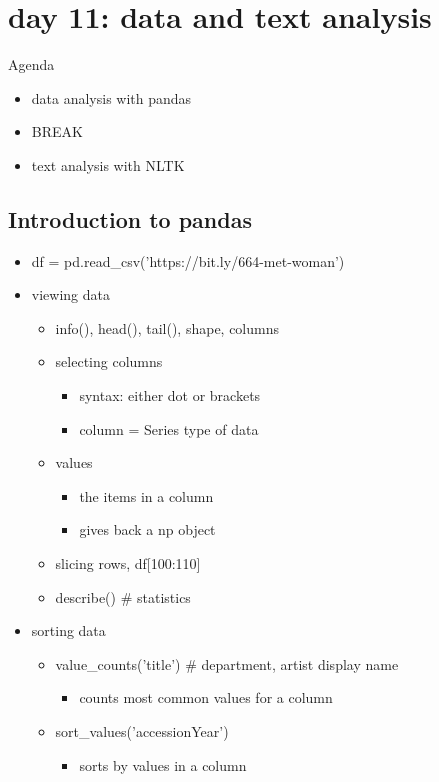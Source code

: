 \documentclass[11pt]{article}
\author{fcalado}
\date{\today}
\title{}
\begin{document}
\tableofcontents

\section{day 11: data and text analysis}
\label{sec:orge4bcb2c}
Agenda
\begin{itemize}
\item data analysis with pandas
\item BREAK
\item text analysis with NLTK
\end{itemize}

\subsection{Introduction to pandas}
\label{sec:orgc60713e}
\begin{itemize}
\item df = pd.read\_csv('https://bit.ly/664-met-woman')
\item viewing data
\begin{itemize}
\item info(), head(), tail(), shape, columns
\item selecting columns
\begin{itemize}
\item syntax: either dot or brackets
\item column = Series type of data
\end{itemize}
\item values
\begin{itemize}
\item the items in a column
\item gives back a np object
\end{itemize}
\item slicing rows, df[100:110]
\item describe() \# statistics
\end{itemize}
\item sorting data
\begin{itemize}
\item value\_counts('title') \# department, artist display name
\begin{itemize}
\item counts most common values for a column
\end{itemize}
\item sort\_values('accessionYear')
\begin{itemize}
\item sorts by values in a column

\end{itemize}
\end{itemize}
\end{itemize}
\end{document}
